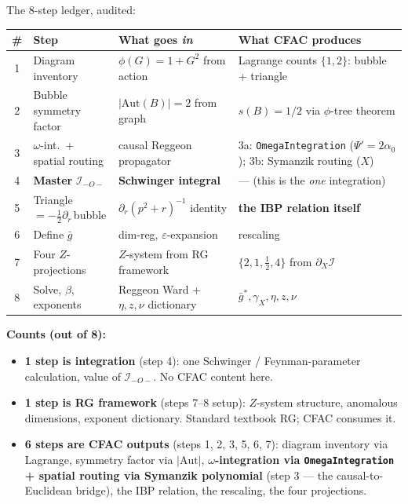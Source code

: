 \documentclass[11pt,a4paper]{article}
\begin{document}
The 8-step ledger, audited:

\begin{center}
\renewcommand{\arraystretch}{1.25}
\small
\begin{tabular}{@{}c p{3.4cm} p{4.6cm} p{6.0cm}@{}}
\toprule
\# & Step & What goes \emph{in} & What CFAC produces \\
\midrule
1 & Diagram inventory      & $\phi(G)=1+G^{2}$ from action & Lagrange counts $\{1,2\}$: bubble + triangle \\
2 & Bubble symmetry factor & $|\mathrm{Aut}(B)|=2$ from graph & $s(B) = 1/2$ via $\phi$-tree theorem \\
3 & $\omega$-int.\ + spatial routing & causal Reggeon propagator & 3a: \texttt{OmegaIntegration} ($\Psi'=2\alpha_{0}$); 3b: Symanzik routing ($X$) \\
4 & \textbf{Master} $\mathcal I_{-O-}$ & \textbf{Schwinger integral} & --- (this is the \emph{one} integration) \\
5 & Triangle $=-\tfrac{1}{2}\partial_{r}\,$bubble & $\partial_{r}(p^{2}+r)^{-1}$ identity & \textbf{the IBP relation itself} \\
6 & Define $\bar g$        & dim-reg, $\varepsilon$-expansion & rescaling \\
7 & Four $Z$-projections   & $Z$-system from RG framework & $\{2,1,\tfrac{1}{2},4\}$ from $\partial_{X}\mathcal I$ \\
8 & Solve, $\beta$, exponents & Reggeon Ward + $\eta,z,\nu$ dictionary & $\bar g^{*}, \gamma_{X}, \eta, z, \nu$ \\
\bottomrule
\end{tabular}
\end{center}

\noindent\textbf{Counts (out of 8):}
\begin{itemize}[itemsep=2pt,leftmargin=1.5em]
\item \textbf{1 step is integration} (step 4): one Schwinger / Feynman-parameter
calculation, value of $\mathcal I_{-O-}$. No CFAC content here.
\item \textbf{1 step is RG framework} (steps 7--8 setup): $Z$-system structure, anomalous
dimensions, exponent dictionary. Standard textbook RG; CFAC consumes it.
\item \textbf{6 steps are CFAC outputs} (steps 1, 2, 3, 5, 6, 7): diagram inventory via
Lagrange, symmetry factor via $|\mathrm{Aut}|$, \textbf{$\omega$-integration via
\texttt{OmegaIntegration} + spatial routing via Symanzik polynomial} (step 3 --- the
causal-to-Euclidean bridge), the IBP relation, the rescaling, the four projections.
\end{itemize}
\end{document}
